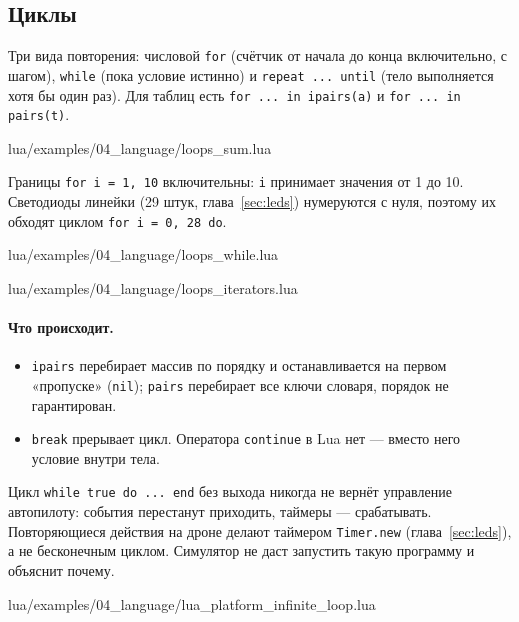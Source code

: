 \subsection{Циклы}

Три вида повторения: числовой \verb|for| (счётчик от начала до конца включительно, с шагом), \verb|while| (пока условие истинно) и \verb|repeat ... until| (тело выполняется хотя бы один раз). Для таблиц есть \verb|for ... in ipairs(a)| и \verb|for ... in pairs(t)|.

\begin{codefile}{lua/examples/04_language/loops_sum.lua}
\end{codefile}

Границы \verb|for i = 1, 10| включительны: \verb|i| принимает значения от 1 до 10. Светодиоды линейки (29 штук, глава~\ref{sec:leds}) нумеруются с нуля, поэтому их обходят циклом \verb|for i = 0, 28 do|.

\begin{codefile}{lua/examples/04_language/loops_while.lua}
\end{codefile}

\begin{codefile}{lua/examples/04_language/loops_iterators.lua}
\end{codefile}

\paragraph{Что происходит.}
\begin{itemize}
    \item \verb|ipairs| перебирает массив по порядку и останавливается на первом «пропуске» (\verb|nil|); \verb|pairs| перебирает все ключи словаря, порядок не гарантирован.
    \item \verb|break| прерывает цикл. Оператора \verb|continue| в Lua нет --- вместо него условие внутри тела.
\end{itemize}

\begin{warnbox}
Цикл \verb|while true do ... end| без выхода никогда не вернёт управление автопилоту: события перестанут приходить, таймеры --- срабатывать. Повторяющиеся действия на дроне делают таймером \verb|Timer.new| (глава~\ref{sec:leds}), а не бесконечным циклом. Симулятор не даст запустить такую программу и объяснит почему.
\end{warnbox}

\begin{codefile}{lua/examples/04_language/lua_platform_infinite_loop.lua}
\end{codefile}

